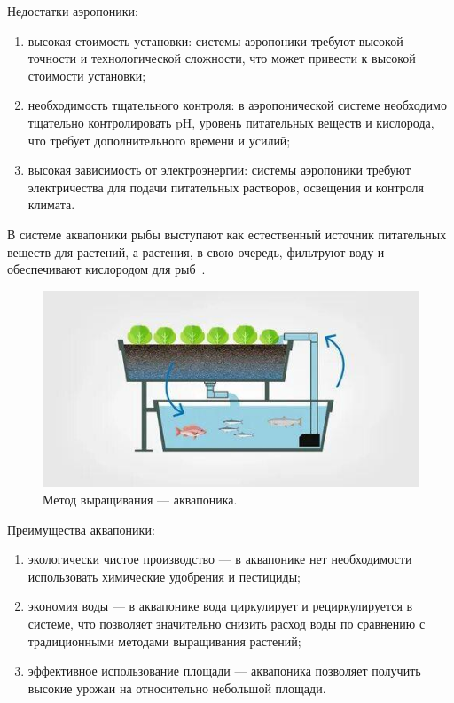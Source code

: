 Недостатки аэропоники:

\begin{enumerate}
    \item высокая стоимость установки: системы аэропоники требуют высокой точности и технологической сложности, что может привести к высокой стоимости установки;
    \item необходимость тщательного контроля: в аэропонической системе необходимо тщательно контролировать pH, уровень питательных веществ и кислорода, что требует дополнительного времени и усилий;
    \item высокая зависимость от электроэнергии: системы аэропоники требуют электричества для подачи питательных растворов, освещения и контроля климата.
\end{enumerate}

В системе аквапоники рыбы выступают как естественный источник питательных веществ для растений, а растения, в свою очередь, фильтруют воду и обеспечивают кислородом для рыб~\cite{Aquaponica}.

\begin{figure}[H]
    \centering
    \includegraphics{images/aquaponica.jpg}
    \caption{Метод выращивания --- аквапоника.}
    \label{fig:aquaponica}
\end{figure}

Преимущества аквапоники:

\begin{enumerate}
    \item экологически чистое производство --- в аквапонике нет необходимости использовать химические удобрения и пестициды;
    \item экономия воды --- в аквапонике вода циркулирует и рециркулируется в системе, что позволяет значительно снизить расход воды по сравнению с традиционными методами выращивания растений;
    \item эффективное использование площади --- аквапоника позволяет получить высокие урожаи на относительно небольшой площади.
\end{enumerate}

